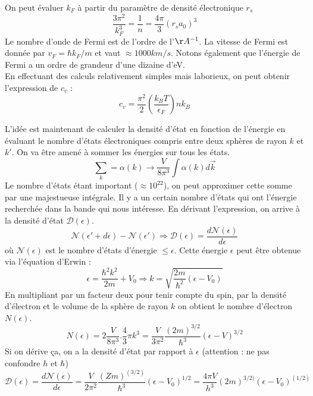 On peut évaluer $k_F$ à partir du paramètre de densité électronique 
$r_s$ 
\begin{equation}
	\frac{3\pi^2}{k_F^3} = \frac{1}{n} = \frac{4\pi}{3}(r_sa_0)^3
\end{equation}
Le nombre d'onde de Fermi est de l'ordre de l'$\AA^{-1}$. La vitesse
de Fermi est donnée par $v_F = \hbar k_F/m$ et vaut $\approx 1000km/s$. 
Notons également que l'énergie de Fermi a un ordre de grandeur d'une 
dizaine d'eV.\\

En effectuant des calculs relativement simples mais laborieux, on 
peut obtenir l'expression de $c_v$ :
\begin{equation}
	c_v = \frac{\pi^2}{2}\left(\frac{k_BT}{\epsilon_F}\right)nk_B
\end{equation}

L'idée est maintenant de calculer la densité d'état en fonction de 
l'énergie en évaluant le nombre d'états électroniques compris entre 
deux sphères de rayon $k$ et $k'$. On va être amené à sommer les 
énergies sur tous les états.
\begin{equation}
	\sum_k = \alpha(k) \rightarrow \frac{V}{8\pi^3}\int\alpha(k)d\vec{k}
\end{equation}
Le nombre d'états étant important ($\approx 10^{22}$), on peut 
approximer cette somme par une majestueuse intégrale. Il y a un certain 
nombre d'états qui ont l'énergie recherchée dans la bande 
qui nous intéresse. En dérivant l'expression, on arrive à la densité 
d'état $\mathcal{D}(\epsilon)$.
\begin{equation}
	\mathcal{N}(\epsilon'+d\epsilon)
	-\mathcal{N}(\epsilon') \Longrightarrow \mathcal{D}(\epsilon) = 
	\frac{d\mathcal{N}(\epsilon)}{d\epsilon}
\end{equation}
où $\mathcal{N}(\epsilon)$ est le nombre d'états d'énergie $\leq 
\epsilon$. Cette énergie $\epsilon$ peut être obtenue via l'équation 
d'Erwin :
\begin{equation}
	\epsilon = \frac{\hbar^2k^2}{2m} + V_0 \Longrightarrow k = \sqrt{
		\frac{2m}{\hbar^2}(\epsilon-V_0)}
\end{equation}
En multipliant par un facteur deux pour tenir compte du spin, par la 
densité d'électron et le volume de la sphère de rayon $k$ on obtient 
le nombre d'électron $N(\epsilon)$.
\begin{equation}
	N(\epsilon) = 2 \frac{V}{8\pi^3}.\frac{4}{3}\pi k^3 = \frac{V}{3\pi^2}
	\frac{(2m)^{3/2}}{\hbar^3}(\epsilon-V)^{3/2}
\end{equation}
Si on dérive ça, on a la densité d'état par rapport à $\epsilon$ 
(attention : ne pas confondre $h$ et $\hbar$)
\begin{equation}
	\mathcal{D}(\epsilon) = \frac{d\mathcal{N}(\epsilon)}{d\epsilon}= 
	\frac{V}{2\pi^2}\frac{(Zm)^{(3/2)}}{\hbar^3}(\epsilon-V_0)^{1/2} = 
	\frac{4\pi V}{h^3} (2m)^{3/2)}(\epsilon-V_0)^{(1/2)}
\end{equation}

